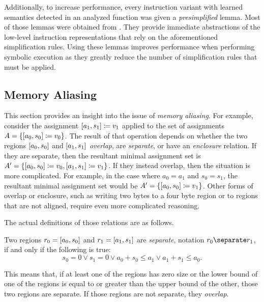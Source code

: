 Additionally, to increase performance,
every instruction variant with learned semantics detected in an analyzed function
was given a \emph{presimplified} lemma.%
Most of those lemmas were obtained from \autocite{verbeek2019refinement}.
They provide immediate abstractions of the low-level instruction representations
that rely on the aforementioned simplification rules.
Using these lemmas improves performance when performing symbolic execution
as they greatly reduce the number of simplification rules that must be applied.

\subsection{Memory Aliasing}\label{memory_aliasing}
This section provides an insight into the issue of \emph{memory aliasing}.%
For example, consider the assignment $[a_1,s_1]\coloneqq v_1$
applied to the set of assignments $A=\{[a_0,s_0]\coloneqq v_0\}$.
The result of that operation
depends on whether the two regions $[a_0,s_0]$ and $[a_1,s_1]$
\emph{overlap}, are \emph{separate}, or have an \emph{enclosure} relation.%
%
%
If they are separate, then the resultant minimal assignment set is
$A'=\{[a_0,s_0]\coloneqq v_0,[a_1,s_1]\coloneqq v_1\}$.
If they instead overlap, then the situation is more complicated.
For example, in the case where $a_0=a_1$ and $s_0=s_1$,
the resultant minimal assignment set would be $A'=\{[a_0,s_0]\coloneqq v_1\}$.
Other forms of overlap or enclosure, such as writing two bytes to a four byte region
or to regions that are not aligned, require even more complicated reasoning.

The actual definitions of those relations are as follows.
\begin{definition}[Separation]\label{def:sep}
  Two regions $r_0=[a_0,s_0]$ and $r_1=[a_1,s_1]$ are \emph{separate},%
  notation $r_0\separate r_1$, if and only if the following is true:
  \begin{equation*}
    s_0=0\vee s_1=0\vee a_0+s_0\leq a_1\vee a_1+s_1\leq a_0.
  \end{equation*}
\end{definition}
This means that, if at least one of the regions has zero size
or the lower bound of one of the regions is equal to or greater than
the upper bound of the other, those two regions are separate.
If those regions are not separate, they \emph{overlap}.

